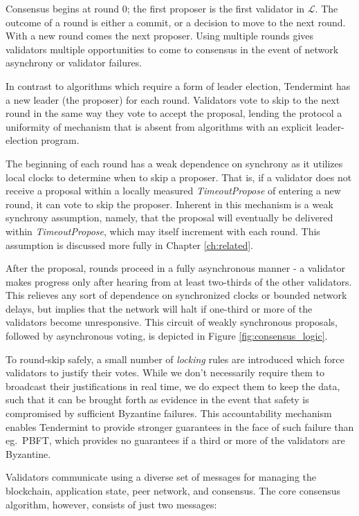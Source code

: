 Consensus begins at round 0; the first proposer is the first validator in $\mathcal{L}$.
The outcome of a round is either a commit, or a decision to move to the next round.
With a new round comes the next proposer.
Using multiple rounds gives validators multiple opportunities 
to come to consensus in the event of network asynchrony or validator failures.

In contrast to algorithms which require a form of leader election, 
Tendermint has a new leader (the proposer) for each round.
Validators vote to skip to the next round in the same way they vote to accept the proposal,
lending the protocol a uniformity of mechanism that is absent 
from algorithms with an explicit leader-election program.

The beginning of each round has a weak dependence on synchrony as it utilizes local clocks to determine when to skip a proposer.
That is, if a validator does not receive a proposal within a locally measured \emph{TimeoutPropose} of entering a new round, it can vote to skip the proposer.
Inherent in this mechanism is a weak synchrony assumption, namely, that the proposal will eventually be delivered within \emph{TimeoutPropose}, which may itself increment with each round.
This assumption is discussed more fully in Chapter \ref{ch:related}.

After the proposal, rounds proceed in a fully asynchronous manner - a validator makes progress only after hearing from at least two-thirds of the other validators.
This relieves any sort of dependence on synchronized clocks or bounded network delays,
but implies that the network will halt if one-third or more of the validators become unresponsive.
This circuit of weakly synchronous proposals, followed by asynchronous voting, 
is depicted in Figure \ref{fig:consensus_logic}.

To round-skip safely, a small number of \emph{locking} rules 
are introduced which force validators to justify their votes.
While we don't necessarily require them to broadcast their justifications in real time, 
we do expect them to keep the data,
such that it can be brought forth as evidence in the event that safety 
is compromised by sufficient Byzantine failures.
This accountability mechanism enables Tendermint to provide 
stronger guarantees in the face of such failure than eg.~PBFT,
which provides no guarantees if a third or more of the validators are Byzantine.

Validators communicate using a diverse set of messages for managing the blockchain, 
application state, peer network, and consensus.
The core consensus algorithm, however, consists of just two messages:

